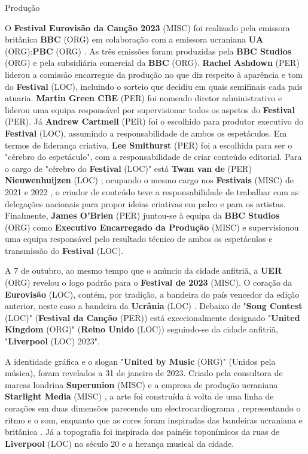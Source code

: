 \documentclass[12pt,a4paper]{article}
\begin{document}
Produção

O \textbf{Festival Eurovisão da Canção 2023} (MISC) foi realizado pela emissora britânica \textbf{BBC} (ORG) em colaboração com a emissora ucraniana \textbf{UA} (ORG):\textbf{PBC} (ORG) . As três emissões foram produzidas pela \textbf{BBC Studios} (ORG) e pela subsidiária comercial da \textbf{BBC} (ORG). \textbf{Rachel Ashdown} (PER) liderou a comissão encarregue da produção no que diz respeito à aparência e tom do \textbf{Festival} (LOC), incluindo o sorteio que decidiu em quais semifinais cada país atuaria. \textbf{Martin Green CBE} (PER) foi nomeado diretor administrativo e liderou uma equipa responsável por supervisionar todos os aspetos do \textbf{Festival} (PER). Já \textbf{Andrew Cartmell} (PER) foi o escolhido para produtor executivo do \textbf{Festival} (LOC), assumindo a responsabilidade de ambos os espetáculos. Em termos de liderança criativa, \textbf{Lee Smithurst} (PER) foi a escolhida para ser o "cérebro do espetáculo", com a responsabilidade de criar conteúdo editorial. Para o cargo de "cérebro do \textbf{Festival} (LOC)" está \textbf{Twan van de} (PER) \textbf{Nieuwenhuijzen} (LOC) ; ocupando o mesmo cargo nos \textbf{Festivais} (MISC) de 2021 e 2022 , o criador de conteúdo teve a responsabilidade de trabalhar com as delegações nacionais para propor ideias criativas em palco e para os artistas. Finalmente, \textbf{James O'Brien} (PER) juntou-se à equipa da \textbf{BBC Studios} (ORG) como \textbf{Executivo Encarregado da Produção} (MISC) e supervisionou uma equipa responsável pelo resultado técnico de ambos os espetáculos e transmissão do \textbf{Festival} (LOC).

A 7 de outubro, ao mesmo tempo que o anúncio da cidade anfitriã, a \textbf{UER} (ORG) revelou o logo padrão para o \textbf{Festival de 2023} (MISC). O coração da \textbf{Eurovisão} (LOC), contém, por tradição, a bandeira do país vencedor da edição anterior, neste caso a bandeira da \textbf{Ucrânia} (LOC) . Debaixo de "\textbf{Song Contest} (LOC)" (\textbf{Festival da Canção} (PER)) está excecionalmente designado "\textbf{United Kingdom} (ORG)" (\textbf{Reino Unido} (LOC)) seguindo-se da cidade anfitriã, "\textbf{Liverpool} (LOC) 2023".

A identidade gráfica e o slogan "\textbf{United by Music} (ORG)" (Unidos pela música), foram revelados a 31 de janeiro de 2023. Criado pela consultora de marcas londrina \textbf{Superunion} (MISC) e a empresa de produção ucraniana \textbf{Starlight Media} (MISC) , a arte foi construída à volta de uma linha de corações em duas dimensões parecendo um electrocardiograma , representando o ritmo e o som, enquanto que as cores foram inspiradas das bandeiras ucraniana e britânica . Já a topografia foi inspirada dos painéis toponímicos da ruas de \textbf{Liverpool} (LOC) no século 20 e a herança musical da cidade.
\end{document}
